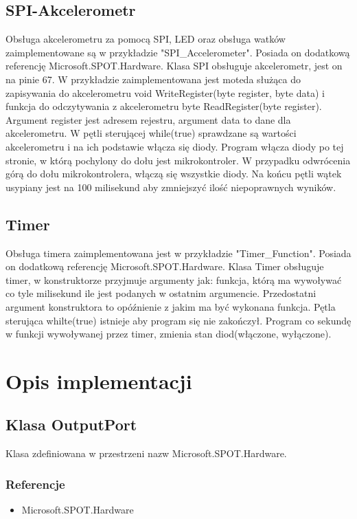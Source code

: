 \documentclass{article}
\begin{document}
\subsection{SPI-Akcelerometr}
Obsługa akcelerometru za pomocą SPI, LED oraz obsługa watków zaimplementowane są w przykładzie "SPI\_Accelerometer". Posiada on dodatkową referencję Microsoft.SPOT.Hardware. Klasa SPI obsługuje akcelerometr, jest on na pinie 67. W przykładzie zaimplementowana jest moteda służąca do zapisywania do akcelerometru  void WriteRegister(byte register, byte data) i funkcja do odczytywania z akcelerometru byte ReadRegister(byte register). Argument register jest adresem rejestru, argument data to dane dla akcelerometru. W pętli sterującej while(true) sprawdzane są wartości akcelerometru i na ich podstawie włącza się diody. Program włącza diody po tej stronie, w którą pochylony do dołu jest mikrokontroler. W przypadku odwrócenia górą do dołu mikrokontrolera, włączą się wszystkie diody. Na końcu pętli wątek usypiany jest na 100 milisekund aby zmniejszyć ilość niepoprawnych wyników. 

\subsection{Timer}
Obsługa timera zaimplementowana jest w przykładzie "Timer\_Function". Posiada on dodatkową referencję Microsoft.SPOT.Hardware. Klasa Timer obsługuje timer, w konstruktorze przyjmuje argumenty jak: funkcja, którą ma wywoływać co tyle milisekund ile jest podanych w ostatnim argumencie. Przedostatni argument konstruktora to opóźnienie z jakim ma być wykonana funkcja. Pętla sterująca whilte(true) {} istnieje aby program się nie zakończył. Program co sekundę w funkcji wywoływanej przez timer, zmienia stan diod(włączone, wyłączone).

\section{Opis implementacji}
\subsection{Klasa OutputPort}
Klasa zdefiniowana w przestrzeni nazw Microsoft.SPOT.Hardware.
\subsubsection{Referencje}
\begin{itemize}
\item Microsoft.SPOT.Hardware
\end{itemize}
\end{document}
